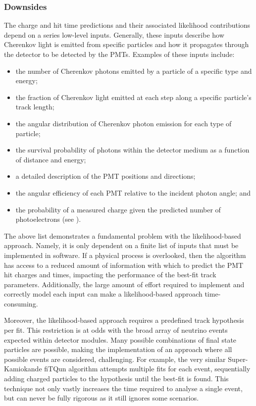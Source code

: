 \subsubsection*{Downsides} %

The charge and hit time predictions and their associated likelihood contributions depend on a
series low-level inputs. Generally, these inputs describe how Cherenkov light is emitted from
specific particles and how it propagates through the detector to be detected by the PMTs. Examples
of these inputs include:
\begin{itemize}
    \item the number of Cherenkov photons emitted by a particle of a specific type and energy;
    \item the fraction of Cherenkov light emitted at each step along a specific particle's track
          length;
    \item the angular distribution of Cherenkov photon emission for each type of particle;
    \item the survival probability of photons within the detector medium as a function of distance
          and energy;
    \item a detailed description of the PMT positions and directions;
    \item the angular efficiency of each PMT relative to the incident photon angle; and
    \item the probability of a measured charge given the predicted number of photoelectrons (see
          ).
\end{itemize}

The above list demonstrates a fundamental problem with the likelihood-based approach. Namely, it
is only dependent on a finite list of inputs that must be implemented in software. If a physical
process is overlooked, then the algorithm has access to a reduced amount of information with which
to predict the PMT hit charges and times, impacting the performance of the best-fit track
parameters. Additionally, the large amount of effort required to implement and correctly model
each input can make a likelihood-based approach time-consuming.

Moreover, the likelihood-based approach requires a predefined track hypothesis per fit. This
restriction is at odds with the broad array of neutrino events expected within \chips detector
modules. Many possible combinations of final state particles are possible, making the
implementation of an approach where all possible events are considered, challenging. For example,
the very similar Super-Kamiokande fiTQun algorithm attempts multiple fits for each event,
sequentially adding charged particles to the hypothesis until the best-fit is found. This
technique not only vastly increases the time required to analyse a single event, but can never be
fully rigorous as it still ignores some scenarios.

